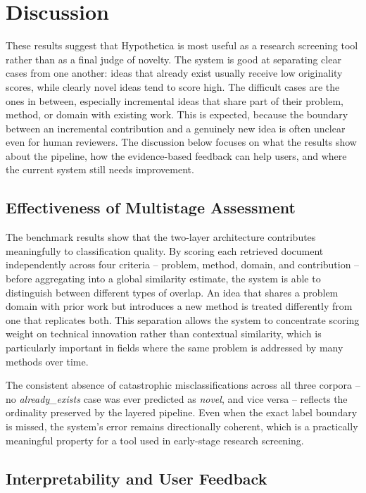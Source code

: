 \section{Discussion}
\label{sec:discussion}

These results suggest that Hypothetica is most useful as a research screening tool rather than as a final judge of novelty. The system is good at separating clear cases from one another: ideas that already exist usually receive low originality scores, while clearly novel ideas tend to score high. The difficult cases are the ones in between, especially incremental ideas that share part of their problem, method, or domain with existing work. This is expected, because the boundary between an incremental contribution and a genuinely new idea is often unclear even for human reviewers. The discussion below focuses on what the results show about the pipeline, how the evidence-based feedback can help users, and where the current system still needs improvement.

\subsection{Effectiveness of Multistage Assessment}

The benchmark results show that the two-layer architecture contributes meaningfully to classification quality. By scoring each retrieved document independently across four criteria -- problem, method, domain, and contribution -- before aggregating into a global similarity estimate, the system is able to distinguish between different types of overlap. An idea that shares a problem domain with prior work but introduces a new method is treated differently from one that replicates both. This separation allows the system to concentrate scoring weight on technical innovation rather than contextual similarity, which is particularly important in fields where the same problem is addressed by many methods over time.

The consistent absence of catastrophic misclassifications across all three corpora -- no \textit{already\_exists} case was ever predicted as \textit{novel}, and vice versa -- reflects the ordinality preserved by the layered pipeline. Even when the exact label boundary is missed, the system's error remains directionally coherent, which is a practically meaningful property for a tool used in early-stage research screening.

\subsection{Interpretability and User Feedback}

